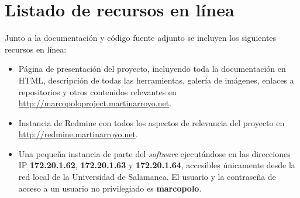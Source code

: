 \chapter{Listado de recursos en línea}
\label{recursosenlinea}
\label{acceso}

Junto a la documentación y código fuente adjunto se incluyen los siguientes recursos en línea:

\begin{itemize}[noitemsep]
\item Página de presentación del proyecto, incluyendo toda la documentación en HTML, descripción de todas las herramientas, galería de imágenes, enlaces a repositorios y otros contenidos relevantes en \href{http://marcopoloproject.martinarroyo.net}{http://marcopoloproject.martinarroyo.net}.
\item Instancia de Redmine con todos los aspectos de relevancia del proyecto en\\ \href{http://redmine.martinarroyo.net}{http://redmine.martinarroyo.net}.
\item Una pequeña instancia de parte del \textit{software} ejecutándose en las direcciones IP \textbf{172.20.1.62}, \textbf{172.20.1.63} y \textbf{172.20.1.64}, accesibles únicamente desde la red local de la Universidad de Salamanca. El usuario y la contraseña de acceso a un usuario no privilegiado es \textbf{marcopolo}.
\end{itemize}